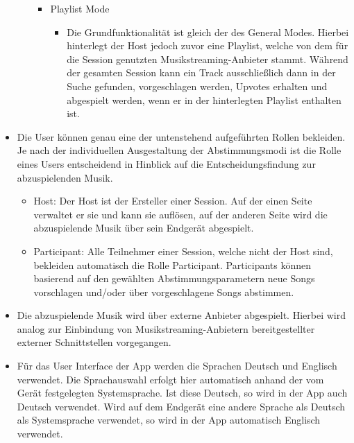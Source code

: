 \documentclass[oneside, ngerman]{sdqtechreport}
\begin{document}
\begin{itemize}
\begin{itemize}
\begin{itemize}
\begin{itemize}
            \end{itemize}
            \item Playlist Mode
            \begin{itemize}
                \item Die Grundfunktionalität ist gleich der des General Modes. Hierbei hinterlegt der Host jedoch zuvor eine Playlist, welche von dem für die Session genutzten Musikstreaming-Anbieter stammt. Während der gesamten Session kann ein Track ausschließlich dann in der Suche gefunden, vorgeschlagen werden, Upvotes erhalten und abgespielt werden, wenn er in der hinterlegten Playlist enthalten ist.
            \end{itemize}
        \end{itemize}

    \end{itemize}
    \item Die User können genau eine der untenstehend aufgeführten Rollen bekleiden. Je nach der individuellen Ausgestaltung der Abstimmungsmodi ist die Rolle eines Users entscheidend in Hinblick auf die Entscheidungsfindung zur abzuspielenden Musik.
    \begin{itemize}
        \item Host: Der Host ist der Ersteller einer Session. Auf der einen Seite verwaltet er sie und kann sie auflösen, auf der anderen Seite wird die abzuspielende Musik über sein Endgerät abgespielt.
        \item Participant: Alle Teilnehmer einer Session, welche nicht der Host sind, bekleiden automatisch die Rolle Participant. Participants können basierend auf den gewählten Abstimmungsparametern neue Songs vorschlagen und/oder über vorgeschlagene Songs abstimmen. 
    \end{itemize}
    \item Die abzuspielende Musik wird über externe Anbieter abgespielt. Hierbei wird analog zur Einbindung von Musikstreaming-Anbietern bereitgestellter externer Schnittstellen vorgegangen.
    \item  Für das User Interface der App werden die Sprachen Deutsch und Englisch verwendet. Die Sprachauswahl erfolgt hier automatisch anhand der vom Gerät festgelegten Systemsprache. Ist diese Deutsch, so wird in der App auch Deutsch verwendet. Wird auf dem Endgerät eine andere Sprache als Deutsch als Systemsprache verwendet, so wird in der App automatisch Englisch verwendet.
\end{itemize}

\hypertarget{Wunschkriterien}{}
\end{document}
